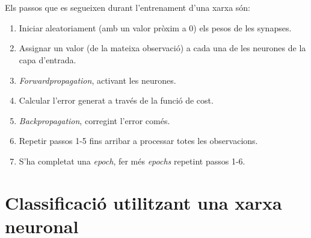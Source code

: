 \documentclass[12pt]{article}
\begin{document}
\pagebreak
\\\\Els passos que es segueixen durant l'entrenament d'una xarxa són:
\begin{enumerate}
	\item Iniciar aleatoriament (amb un valor pròxim a 0) els pesos de les synapses.
	\item Assignar un valor (de la mateixa observació) a cada una de les neurones de la capa d'entrada.
	\item \textit{Forwardpropagation}, activant les neurones.
	\item Calcular l'error generat a través de la funció de cost.
	\item \textit{Backpropagation}, corregint l'error comés.
	\item Repetir passos 1-5 fins arribar a processar totes les observacions.
	\item S'ha completat una \textit{epoch}, fer més \textit{epochs} repetint passos 1-6.
\end{enumerate}

\clearpage
\section{Classificació utilitzant una xarxa neuronal}
\end{document}
